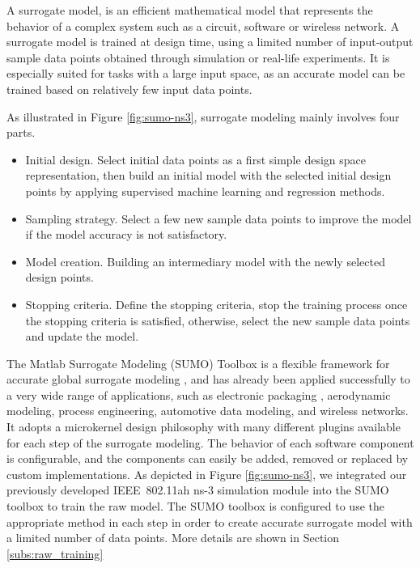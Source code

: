  A surrogate model, is an efficient mathematical model that represents the behavior of a complex system such as a circuit, software or wireless network. A surrogate model is trained at design time, using a limited number of input-output sample data points obtained through simulation or real-life experiments. It is especially suited for tasks with a large input space, as an accurate model can be trained based on relatively few input data points.
 
 As illustrated in Figure \ref{fig:sumo-ns3},  surrogate modeling mainly involves four parts.
 \begin{itemize}
 \item  Initial design. Select initial data points as a first simple design space representation, then build an initial model with the selected initial design points by applying supervised machine learning and regression methods. 
 \item  Sampling strategy. Select a few new sample data points to improve the model if the model accuracy is not satisfactory.  \item  Model creation. Building an intermediary model with the newly selected design points. 
 \item  Stopping criteria. Define the stopping criteria, stop the training process once the stopping criteria is satisfied, otherwise, select the new sample data points and update the model. 
 \end{itemize}
  
 The Matlab Surrogate Modeling (SUMO) Toolbox is a flexible framework for accurate global surrogate modeling \cite{SUMOtoolbox2010}, and has already been applied successfully to a very wide range of applications, such as electronic packaging , aerodynamic modeling, process engineering, automotive data modeling, and wireless networks.
 It adopts a microkernel design philosophy with many different plugins available for each step of the surrogate modeling. The behavior of each software component is configurable, and the components can easily be added, removed or replaced by custom implementations. As depicted in Figure \ref{fig:sumo-ns3}, we integrated our previously developed IEEE~802.11ah ns-3 simulation module \cite{WNS32018} into the SUMO toolbox to train the \gls{raw} model. The SUMO toolbox is configured to use the appropriate method in each step in order to create  accurate surrogate model with a limited number of data points. More details are  shown in Section \ref{subs:raw_training}
 


